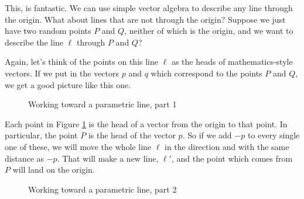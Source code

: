 \documentclass[00-livre-main.tex]{subfiles}
\begin{document}
This, is fantastic. We can use simple vector algebra to describe any line through the origin. 
What about lines that are not through the origin? 
Suppose we just have two random points $P$ and $Q$, neither of which is the origin, and we want to describe the line $\ell$ through $P$ and $Q$?

Again, let's think of the points on this line $\ell$ as the heads of mathematics-style vectors. 
If we put in the vectors $p$ and $q$ which correspond to the points $P$ and $Q$, we get a good picture like this one.

\begin{figure}[h!]
\centering
{}
\caption{Working toward a parametric line, part 1}
\label{fig:param-line1}
\end{figure}

Each point in Figure \ref{fig:param-line1} is the head of a vector from the origin to that point. 
In particular, the point $P$ is the head of the vector $p$. 
So if we add $-p$ to every single one of these, we will move the whole line $\ell$ in the direction and with the same distance as $-p$.
That will make a new line, $\ell'$, and the point which comes from $P$ will land on the origin.


\begin{figure}[h!]
\centering
{}
\caption{Working toward a parametric line, part 2}
\label{fig:param-line2}
\end{figure}
\end{document}
